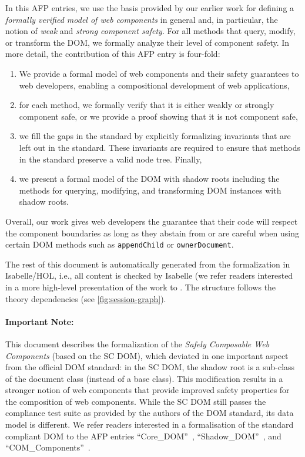 \documentclass[10pt,DIV16,a4paper,abstract=true,twoside=semi,openright]
{scrreprt}
\begin{document}
In this AFP entries, we use the basis provided by our earlier work for
defining a \emph{formally verified model of web components} in general
and, in particular, the notion of \emph{weak} and \emph{strong
  component safety}. For all methods that query, modify, or transform
the DOM, we formally analyze their level of component safety. In more
detail, the contribution of this AFP entry is four-fold:
\begin{enumerate}
\item We provide a formal model of web components and their safety
  guarantees to web developers, enabling a compositional development
  of web applications,
\item for each method, we formally verify that it is either weakly or
  strongly component safe, or we provide a proof showing
  that it is not component safe,
\item we fill the gaps in the standard by explicitly formalizing
  invariants that are left out in the standard. These invariants are
  required to ensure that methods in the standard preserve a valid
  node tree. Finally,
\item we present a formal model of the DOM with shadow roots including
  the methods for querying, modifying, and transforming DOM instances
  with shadow roots.
\end{enumerate}
Overall, our work gives web developers the guarantee that their code
will respect the component boundaries as long as they abstain from or
are careful when using certain DOM methods such as
\texttt{appendChild} or \texttt{ownerDocument}.

The rest of this document is automatically generated from the
formalization in Isabelle/HOL, i.e., all content is checked by
Isabelle (we refer readers interested in a more high-level
presentation of the work to \cite{herzberg:web-components:2020,
  brucker.ea:web-components:2019}. The structure follows the theory
dependencies (see \autoref{fig:session-graph}).


\paragraph{Important Note:} This document describes the formalization
of the \emph{Safely Composable Web Components} (based on the SC DOM),
which deviated in one important aspect from the official DOM standard: 
in the SC DOM, the shadow root is a sub-class of the document class 
(instead of a base class). This modification results in a stronger notion 
of web components that provide improved safety properties for the composition of web
components. While the SC DOM still passes the compliance test suite as
provided by the authors of the DOM standard, its data model is
different. We refer readers interested in a formalisation of the
standard compliant DOM to the AFP entries
``Core\_DOM''~\cite{brucker.ea:afp-core-dom:2018}, 
``Shadow\_DOM''~\cite{brucker.ea:afp-shadow-dom:2020}, and 
``COM\_Components''~\cite{brucker.ea:afp-dom-components:2020}.
\end{document}
